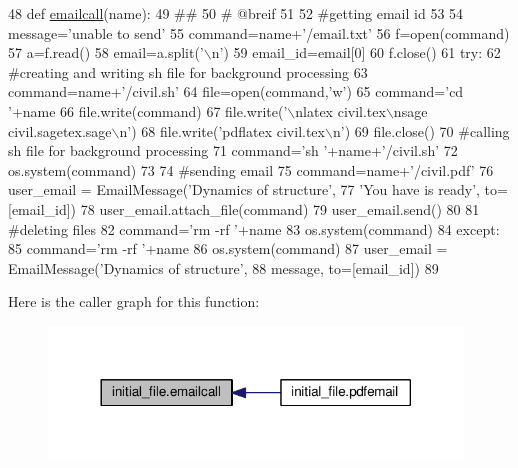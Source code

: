 \begin{DoxyCode}
48 \textcolor{keyword}{def }\hyperlink{namespaceinitial__file_ad9d26ace18fc618ee70df3c0c94927b7}{emailcall}(name):
49     \textcolor{comment}{##}
50     \textcolor{comment}{# @breif }
51     
52     \textcolor{comment}{#getting email id}
53     
54     message=\textcolor{stringliteral}{'unable to send'}
55     command=name+\textcolor{stringliteral}{'/email.txt'}
56     f=open(command)
57     a=f.read()
58         email=a.split(\textcolor{stringliteral}{'\(\backslash\)n'})
59         email\_id=email[0]
60     f.close()
61     \textcolor{keywordflow}{try}:
62         \textcolor{comment}{#creating and writing sh file for background processing}
63         command=name+\textcolor{stringliteral}{'/civil.sh'}
64         file=open(command,\textcolor{stringliteral}{'w'})
65         command=\textcolor{stringliteral}{'cd '}+name
66         file.write(command)
67         file.write(\textcolor{stringliteral}{'\(\backslash\)nlatex civil.tex\(\backslash\)nsage civil.sagetex.sage\(\backslash\)n'})
68         file.write(\textcolor{stringliteral}{'pdflatex civil.tex\(\backslash\)n'})
69         file.close()
70         \textcolor{comment}{#calling sh file for background processing}
71         command=\textcolor{stringliteral}{'sh '}+name+\textcolor{stringliteral}{'/civil.sh'}
72         os.system(command)
73 
74         \textcolor{comment}{#sending email}
75         command=name+\textcolor{stringliteral}{'/civil.pdf'}
76         user\_email = EmailMessage(\textcolor{stringliteral}{'Dynamics of structure'},
77         \textcolor{stringliteral}{'You have is ready'}, to=[email\_id])
78         user\_email.attach\_file(command)
79         user\_email.send()
80 
81         \textcolor{comment}{#deleting files}
82         command=\textcolor{stringliteral}{'rm -rf '}+name
83         os.system(command)
84     \textcolor{keywordflow}{except}:
85                 command=\textcolor{stringliteral}{'rm -rf '}+name
86                 os.system(command)
87         user\_email = EmailMessage(\textcolor{stringliteral}{'Dynamics of structure'},
88         message, to=[email\_id])
89 
\end{DoxyCode}


Here is the caller graph for this function\+:\nopagebreak
\begin{figure}[H]
\begin{center}
\leavevmode
\includegraphics[width=312pt]{namespaceinitial__file_ad9d26ace18fc618ee70df3c0c94927b7_icgraph}
\end{center}
\end{figure}



